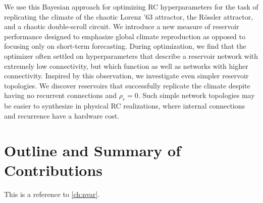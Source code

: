 We use this Bayesian approach for optimizing RC hyperparameters for the task of replicating the climate of the chaotic Lorenz '63
attractor,\cite{lorenz1963}
the R{\"{o}}ssler attractor,\cite{rossler1976} and a chaotic double-scroll circuit.\cite{gauthier1996}
We introduce a new
measure of reservoir performance designed to emphasize global climate
reproduction as opposed to focusing only on short-term forecasting.  During
optimization, we find that the optimizer often settled on
hyperparameters that describe a reservoir network with extremely low
connectivity, but which function as well as networks with higher
connectivity. Inspired by this observation, we investigate even simpler
reservoir topologies. We discover reservoirs that successfully
replicate the climate despite having no recurrent connections and 
$\rho_r=0$. Such simple network topologies may be easier to synthesize in physical RC realizations, where internal connections and recurrence
have a hardware cost.

\section{Outline and Summary of Contributions}

This is a reference to \cref{ch:nvar}.
